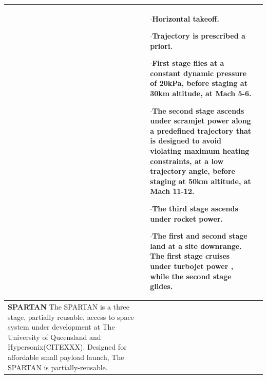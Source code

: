 {\begin{landscape}
\begin{xltabular}{\linewidth}{|X|X|X|}
	
	&\small
	$\cdot$Horizontal takeoff. 
	
	$\cdot$Trajectory is prescribed a priori.
	
	$\cdot$First stage flies at a constant dynamic pressure of 20kPa, before staging at 30km altitude, at Mach 5-6.
	
	$\cdot$The second stage ascends under scramjet power along a predefined trajectory that is designed to avoid violating maximum heating constraints, at a low trajectory angle, before staging at 50km altitude, at Mach 11-12.
	
	$\cdot$The third stage ascends under rocket power. 
	
	$\cdot$The first and second stage land at a site downrange. The first stage cruises under turbojet power , while the second stage glides. 
	

	\\
	\hline \small
	\textbf{SPARTAN}\cite{Preller2018a} \newline\newline
	The SPARTAN is a three stage, partially reusable, access to space system under development at The University of Queensland\cite{Jazra2013,Preller2018a} and Hypersonix(CITEXXX). Designed for affordable small payload launch, The SPARTAN is partially-reusable. 
	&\small
	

\end{xltabular}
\end{landscape}}
